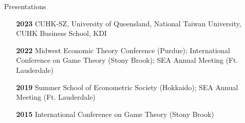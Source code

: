 \begin{rSection}{Presentations}

\begin{itemize}
	\item [\textbf{2023}] CUHK-SZ, University of Queensland, National Taiwan University, CUHK Business School, KDI
	\item [\textbf{2022}] Midwest Economic Theory Conference (Purdue); International Conference on Game Theory (Stony Brook); SEA Annual Meeting (Ft. Lauderdale)
	\item [\textbf{2019}] Summer School of Econometric Society (Hokkaido); SEA Annual Meeting (Ft. Lauderdale)
	\item [\textbf{2015}] International Conference on Game Theory (Stony Brook)
\end{itemize}
	

\end{rSection}
